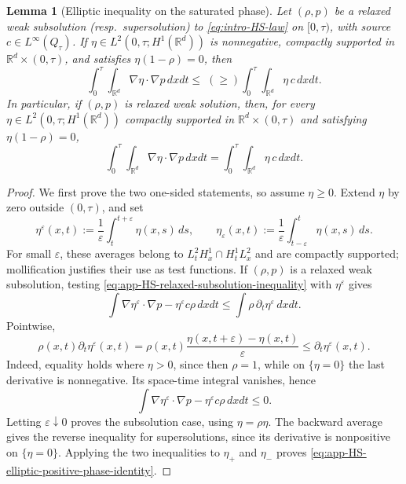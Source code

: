 \documentclass[11pt]{amsart}
\numberwithin{equation}{section}
\numberwithin{figure}{section}
\theoremstyle{plain}
\newtheorem{lem}[thm]{Lemma}
\theoremstyle{definition}
\theoremstyle{remark}
\theoremstyle{plain}
\def\R{\mathbb{R}}
\begin{document}
\begin{lem}[Elliptic inequality on the saturated phase]\label{lem:app-HS-elliptic-positive-phase}
Let \((\rho,p)\) be a relaxed weak subsolution (resp.\ supersolution) to
\eqref{eq:intro-HS-law} on \([0,\tau)\), with source
\(c\in L^\infty(Q_\tau)\).  If
\(\eta\in L^2(0,\tau;H^1(\R^d))\) is nonnegative, compactly supported in
\(\R^d\times(0,\tau)\), and satisfies \(\eta(1-\rho)=0\), then
\begin{equation}\label{eq:app-HS-elliptic-positive-phase}
    \int_0^\tau\!\!\int_{\R^d}\nabla\eta\cdot\nabla p\,dxdt
    \leq\;(\geq)
    \int_0^\tau\!\!\int_{\R^d}\eta\,c\,dxdt.
\end{equation}
In particular, if \((\rho,p)\) is relaxed weak solution, then, for
every
\(\eta\in L^2(0,\tau;H^1(\R^d))\) compactly supported in
\(\R^d\times(0,\tau)\) and satisfying \(\eta(1-\rho)=0\),
\begin{equation}\label{eq:app-HS-elliptic-positive-phase-identity}
    \int_0^\tau\!\!\int_{\R^d}\nabla\eta\cdot\nabla p\,dxdt
    =
    \int_0^\tau\!\!\int_{\R^d}\eta\,c\,dxdt .
\end{equation}
\end{lem}

\begin{proof}
We first prove the two one-sided statements, so assume \(\eta\geq0\).
Extend \(\eta\) by zero outside \((0,\tau)\), and set
\[
    \eta^\varepsilon(x,t)
    :=\frac1\varepsilon\int_t^{t+\varepsilon}\eta(x,s)\,ds,
    \qquad
    \eta_\varepsilon(x,t)
    :=\frac1\varepsilon\int_{t-\varepsilon}^t\eta(x,s)\,ds .
\]
For small \(\varepsilon\), these averages belong to
\(L^2_tH^1_x\cap H^1_tL^2_x\) and are compactly supported; mollification
justifies their use as test functions. If \((\rho,p)\) is a relaxed weak subsolution, testing
\eqref{eq:app-HS-relaxed-subsolution-inequality} with \(\eta^\varepsilon\) gives
\[
    \int\nabla\eta^\varepsilon\cdot\nabla p-\eta^\varepsilon c\rho\,dxdt
    \leq
    \int\rho\,\partial_t\eta^\varepsilon\,dxdt .
\]
Pointwise,
\[
    \rho(x,t)\partial_t\eta^\varepsilon(x,t)
    =
    \rho(x,t)\frac{\eta(x,t+\varepsilon)-\eta(x,t)}{\varepsilon}
    \leq
    \partial_t\eta^\varepsilon(x,t).
\]
Indeed, equality holds where \(\eta>0\), since then \(\rho=1\), while
on \(\{\eta=0\}\) the last derivative is nonnegative. Its space-time integral
vanishes, hence
\[
    \int\nabla\eta^\varepsilon\cdot\nabla p-\eta^\varepsilon c\rho\,dxdt
    \leq0 .
\]
Letting \(\varepsilon\downarrow0\) proves the subsolution case, using
\(\eta=\rho\eta\). The backward average gives the reverse inequality for
supersolutions, since its derivative is nonpositive on \(\{\eta=0\}\).
Applying the two inequalities to \(\eta_+\) and \(\eta_-\) proves
\eqref{eq:app-HS-elliptic-positive-phase-identity}.
\end{proof}
\end{document}
